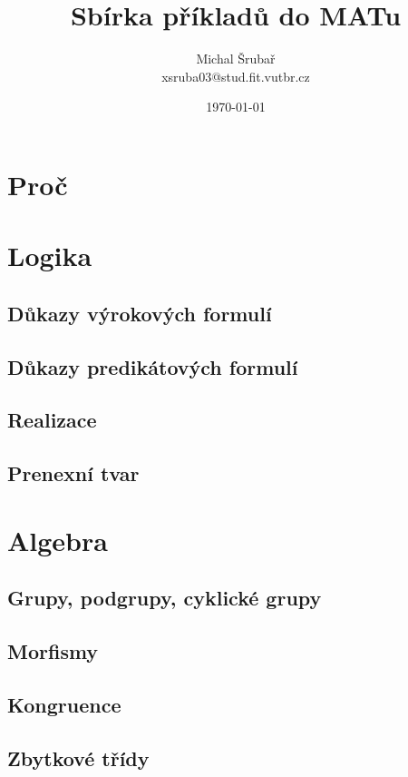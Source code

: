 \documentclass[12pt,a4paper,notitlepage,final]{article}
\author{Michal Šrubař\\xsruba03@stud.fit.vutbr.cz}
\date{\today}
\title{Sbírka příkladů do MATu}
\begin{document}
\maketitle

\section{Proč} \label{proc}

\section{Logika} \label{logika}
\subsection{Důkazy výrokových formulí}        
\subsection{Důkazy predikátových formulí}     
\subsection{Realizace}                        
\subsection{Prenexní tvar}                    

\section{Algebra}
\subsection{Grupy, podgrupy, cyklické grupy}  
\subsection{Morfismy}                         
\subsection{Kongruence}                       
\subsection{Zbytkové třídy}                   
\end{document}
